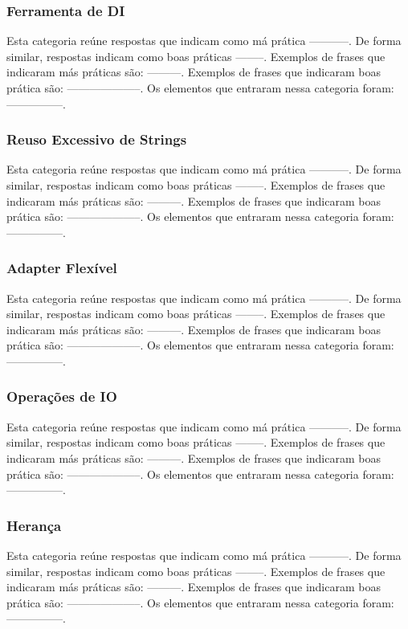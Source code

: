 \subsubsection{Ferramenta de DI}
Esta categoria re\'une respostas que indicam como m\'a pr\'atica -----------. De forma similar, respostas indicam como boas pr\'aticas --------. Exemplos de frases que indicaram m\'as pr\'aticas s\~ao: ---------. Exemplos de frases que indicaram boas pr\'atica s\~ao: --------------------. Os elementos que entraram nessa categoria foram: ---------------. 


\subsubsection{Reuso Excessivo de Strings}
Esta categoria re\'une respostas que indicam como m\'a pr\'atica -----------. De forma similar, respostas indicam como boas pr\'aticas --------. Exemplos de frases que indicaram m\'as pr\'aticas s\~ao: ---------. Exemplos de frases que indicaram boas pr\'atica s\~ao: --------------------. Os elementos que entraram nessa categoria foram: ---------------. 


\subsubsection{Adapter Flexível}
Esta categoria re\'une respostas que indicam como m\'a pr\'atica -----------. De forma similar, respostas indicam como boas pr\'aticas --------. Exemplos de frases que indicaram m\'as pr\'aticas s\~ao: ---------. Exemplos de frases que indicaram boas pr\'atica s\~ao: --------------------. Os elementos que entraram nessa categoria foram: ---------------. 


\subsubsection{Operações de IO}
Esta categoria re\'une respostas que indicam como m\'a pr\'atica -----------. De forma similar, respostas indicam como boas pr\'aticas --------. Exemplos de frases que indicaram m\'as pr\'aticas s\~ao: ---------. Exemplos de frases que indicaram boas pr\'atica s\~ao: --------------------. Os elementos que entraram nessa categoria foram: ---------------. 


\subsubsection{Herança}
Esta categoria re\'une respostas que indicam como m\'a pr\'atica -----------. De forma similar, respostas indicam como boas pr\'aticas --------. Exemplos de frases que indicaram m\'as pr\'aticas s\~ao: ---------. Exemplos de frases que indicaram boas pr\'atica s\~ao: --------------------. Os elementos que entraram nessa categoria foram: ---------------. 


